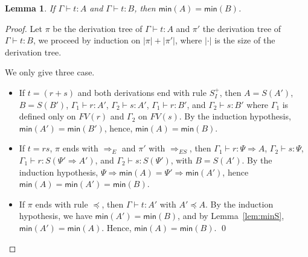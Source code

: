 \documentclass[preprint]{elsarticle}
\newtheorem{lemma}[theorem]{Lemma}
\newcommand\pair[2]{({#1}+{#2})}
\begin{document}
        \begin{lemma}\label{lem:min}
          If $\Gamma\vdash t:A$ and $\Gamma\vdash t:B$, then $\mathsf{min}(A)=\mathsf{min}(B)$.
        \end{lemma}
        \begin{proof}
          Let $\pi$ be the derivation tree of $\Gamma\vdash t:A$ and $\pi'$ the
          derivation tree of $\Gamma\vdash t:B$, we proceed by induction on
          $|\pi|+|\pi'|$, where $|\cdot|$ is the size of the derivation tree.

          We only give three case.
          
          \begin{itemize}
          \item If $t=\pair{r}{s}$ and both derivations end with rule
            $S^+_I$, then $A=S(A')$, $B=S(B')$, 
            $\Gamma_1\vdash r:A'$,
            $\Gamma_2\vdash s:A'$,
            $\Gamma_1\vdash r:B'$,
            and $\Gamma_2\vdash s:B'$ where $\Gamma_1$ is defined only on $FV(r)$ and $\Gamma_2$
            on $FV(s)$.
            By the induction hypothesis, $\mathsf{min}(A')=\mathsf{min}(B')$,
            hence, $\mathsf{min}(A)=\mathsf{min}(B)$.
          \item If $t=rs$, $\pi$ ends with $\Rightarrow_E$ and $\pi'$ with
            $\Rightarrow_{ES}$, then 
            $\Gamma_1\vdash r:\Psi\Rightarrow A$, $\Gamma_2\vdash s:\Psi$,
            $\Gamma_1\vdash r:S(\Psi'\Rightarrow A')$, and $\Gamma_2\vdash
            s:S(\Psi')$, with $B=S(A')$.
            By the induction hypothesis,
            $\Psi\Rightarrow\mathsf{min}(A)=\Psi'\Rightarrow\mathsf{min}(A')$,
            hence $\mathsf{min}(A)=\mathsf{min}(A')=\mathsf{min}(B)$.
          \item If $\pi$ ends with rule $\preceq$, then $\Gamma\vdash t:A'$ with
            $A'\preceq A$. By the induction hypothesis, we have
            $\mathsf{min}(A')=\mathsf{min}(B)$, and by Lemma~\ref{lem:minS},
            $\mathsf{min}(A')=\mathsf{min}(A)$.
            Hence, $\mathsf{min}(A)=\mathsf{min}(B)$.
            \qed
          \end{itemize}
        \end{proof}
\end{document}
